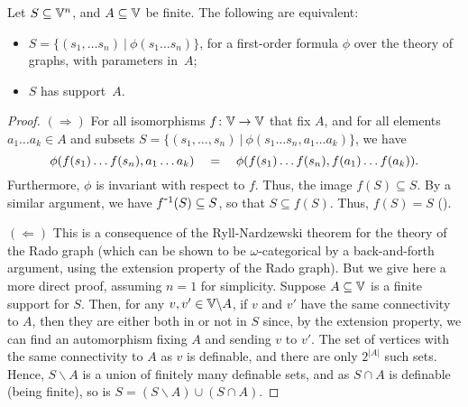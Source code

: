  \begin{proposition}\label{prop:radonom-definable-sets}
    Let $S\subseteq \mathbb{V}^n$, and $A\subseteq \mathbb{V}$ be finite. The following are equivalent:
    \begin{itemize}
      \item $S=\{(s_1,\dots s_n)~|~\phi(s_1\dots s_n)\}$, for a
        first-order formula
        $\phi$ over the theory of graphs, with parameters in~$A$;
      \item $S$ has support~$A$.
        \end{itemize}
      \end{proposition}
      \begin{proof}
      $(\Rightarrow)$ For all isomorphisms $f\colon \mathbb{V} \to \mathbb{V}$ that fix $A$, and for all elements $a_1\dots a_k \in A$ and 
      subsets
      $S=\{(s_1,\dots, s_n)~|~\phi(s_1\dots s_n, a_1\dots a_k)\}$,
      we have 
\[       \phi(f(s_1)\dots f(s_n), a_1\dots a_k) \quad= \quad
       \phi(f(s_1)\dots f(s_n), f(a_1)\dots f(a_k)) \text .
      \]
      Furthermore, $\phi$ is invariant with respect to $f$. Thus, the image $f(S) \subseteq S$. By a similar argument, we have $f\inv(S) \subseteq S$, so that $S \subseteq f(S)$. Thus, $f(S) = S$
      (\hspace{1sp}\cite[Prop. 1.3.5]{markerModelTheoryIntroduction2002}).

      $(\Leftarrow)$
      This is a consequence of the Ryll-Nardzewski theorem for the theory of the Rado graph (which can be shown to be $ω$-categorical by a back-and-forth argument, using the extension property of the Rado graph). But we give here a more direct proof, assuming $n = 1$ for simplicity. Suppose $A \subseteq \mathbb{V}$ is a finite support for $S$. Then, for any $v,v' \in \mathbb{V} \backslash A$, if $v$ and $v'$ have the same connectivity to $A$, then they are either both in or not in $S$ since, by the extension property, we can find an automorphism fixing $A$ and sending $v$ to $v'$. The set of vertices with the same connectivity to $A$ as $v$ is definable, and there are only $2^{|A|}$ such sets. Hence, $S \backslash A$ is a union of finitely many definable sets, and as $S \cap A$ is definable (being finite), so is $S = (S \backslash A) \cup (S \cap A)$.
      \end{proof}

